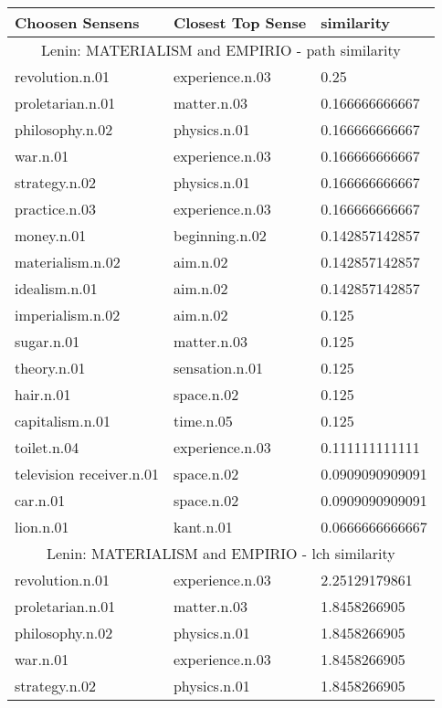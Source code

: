 
    \begin{center}
      \begin{tabular}{ | l | l | l |}
        \hline
        Choosen Sensens & Closest Top Sense & similarity  \\ \hline
\multicolumn{3}{|c|}{Lenin: MATERIALISM and EMPIRIO - path similarity} \\ \hline
revolution.n.01 & experience.n.03 & 0.25 \\ \hline
proletarian.n.01 & matter.n.03 & 0.166666666667 \\ \hline
philosophy.n.02 & physics.n.01 & 0.166666666667 \\ \hline
war.n.01 & experience.n.03 & 0.166666666667 \\ \hline
strategy.n.02 & physics.n.01 & 0.166666666667 \\ \hline
practice.n.03 & experience.n.03 & 0.166666666667 \\ \hline
money.n.01 & beginning.n.02 & 0.142857142857 \\ \hline
materialism.n.02 & aim.n.02 & 0.142857142857 \\ \hline
idealism.n.01 & aim.n.02 & 0.142857142857 \\ \hline
imperialism.n.02 & aim.n.02 & 0.125 \\ \hline
sugar.n.01 & matter.n.03 & 0.125 \\ \hline
theory.n.01 & sensation.n.01 & 0.125 \\ \hline
hair.n.01 & space.n.02 & 0.125 \\ \hline
capitalism.n.01 & time.n.05 & 0.125 \\ \hline
toilet.n.04 & experience.n.03 & 0.111111111111 \\ \hline
television receiver.n.01 & space.n.02 & 0.0909090909091 \\ \hline
car.n.01 & space.n.02 & 0.0909090909091 \\ \hline
lion.n.01 & kant.n.01 & 0.0666666666667 \\ \hline
\multicolumn{3}{|c|}{Lenin: MATERIALISM and EMPIRIO - lch similarity} \\ \hline
revolution.n.01 & experience.n.03 & 2.25129179861 \\ \hline
proletarian.n.01 & matter.n.03 & 1.8458266905 \\ \hline
philosophy.n.02 & physics.n.01 & 1.8458266905 \\ \hline
war.n.01 & experience.n.03 & 1.8458266905 \\ \hline
strategy.n.02 & physics.n.01 & 1.8458266905 \\ \hline

\end{tabular}
\end{center}
